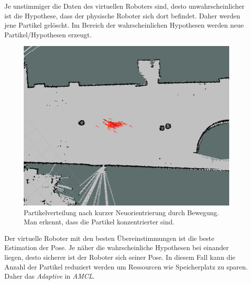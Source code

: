 \documentclass[11pt,a4paper]{article}
\begin{document}
{	Je unstimmiger die Daten des virtuellen Roboters sind, desto unwahrscheinlicher ist die Hypothese, dass der physische Roboter  sich dort befindet. Daher werden jene Partikel gel\"oscht. Im Bereich der wahrscheinlichen Hypothesen werden neue Partikel/Hypothesen erzeugt.
	
\begin{figure}[h]
	\includegraphics[width=\linewidth]{pictures/drive_little.jpg}
	\caption{Partikelverteilung nach kurzer Neuorientrierung durch Bewegung. Man erkennt, dass die Partikel konzentrierter sind.}
\end{figure}
		
	Der virtuelle Roboter  mit den besten \"Ubereinstimmungen ist die beste Estimation der Pose.
	Je n\"aher die wahrscheinliche Hypothesen bei einander liegen, desto sicherer ist der Roboter sich seiner Pose. In diesem Fall kann die Anzahl der Partikel reduziert werden um Ressourcen wie Speicherplatz zu sparen. Daher das \textit{Adaptive} in \textit{AMCL}.
}
\newpage
\end{document}
